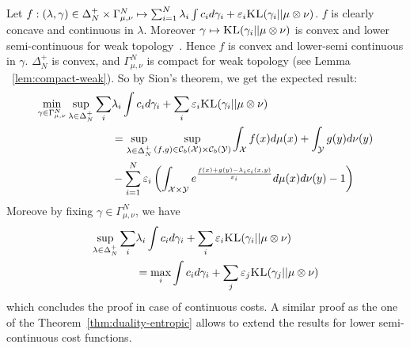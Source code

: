 \begin{prv*}
Let $f: (\lambda,\gamma)\in\Delta^+_N\times\Gamma^N_{\mu,\nu}\mapsto\sum_{i=1}^N \lambda_i\int c_i d\gamma_i + \varepsilon_i \textsc{KL}(\gamma_i||\mu\otimes\nu)$. $f$ is clearly concave and continuous in $\lambda$. Moreover $\gamma\mapsto \textsc{KL}(\gamma_i||\mu\otimes\nu)$ is convex and lower semi-continuous for weak topology~\citep[Lemma 1.4.3]{dupuis2011weak}. Hence $f$ is convex and lower-semi continuous in $\gamma$. $\Delta^+_N$ is  convex, and  $\Gamma^N_{\mu,\nu}$ is compact for weak topology (see  Lemma
~\ref{lem:compact-weak}). So by Sion's theorem,  we get the expected  result:
\begin{align*}
\min_{\gamma\in\Gamma^N_{\mu,\nu}} \sup_{\lambda\in\Delta^+_N}\sum_{i}&\lambda_i \int c_i d\gamma_i + \sum_i\varepsilon_i \textsc{KL}(\gamma_i||\mu\otimes\nu)\\
&=\sup_{\lambda\in\Delta^+_N} \sup_{(f,g)\in\mathcal{C}_b(\mathcal{X})\times\mathcal{C}_b(\mathcal{Y})}\int_{\mathcal{X}} f(x)d\mu(x)+ \int_{\mathcal{Y}} g(y)d\nu(y)\\
&-\sum_{i=1}^N\varepsilon_i\left( \int_{\mathcal{X}\times\mathcal{Y}} e^{\frac{f(x)+g(y)-\lambda_ic_i(x,y)}{\varepsilon_i}} d\mu(x)d\nu(y)-1\right)
\end{align*}
Moreove by fixing $\gamma\in\Gamma^N_{\mu,\nu}$, we have
\begin{align*}
\sup_{\lambda\in\Delta^+_N}\sum_{i}&\lambda_i \int c_i d\gamma_i + \sum_i\varepsilon_i \textsc{KL}(\gamma_i||\mu\otimes\nu)\\
&=\max_{i}\int c_i d\gamma_i + \sum_j\varepsilon_j \textsc{KL}(\gamma_j||\mu\otimes\nu)\\
\end{align*}
which concludes the proof in case of continuous costs. A similar proof as the one of the Theorem~\ref{thm:duality-entropic} allows to extend the results for lower semi-continuous cost functions.
\end{prv*}




\newpage 

